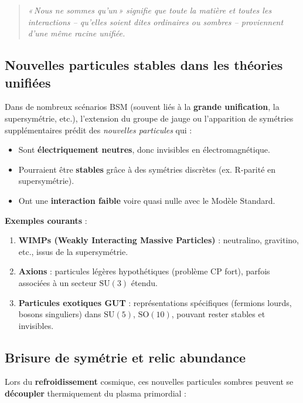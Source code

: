 \documentclass[12pt]{article}
\begin{document}
\begin{quote}
\emph{«\,Nous ne sommes qu’un\,» signifie que toute la matière et toutes les interactions -- qu’elles soient dites \og ordinaires \fg{} ou \og sombres \fg{} -- proviennent d’une même racine unifiée.}
\end{quote}

\subsection{Nouvelles particules stables dans les théories unifiées}

Dans de nombreux scénarios BSM (souvent liés à la \textbf{grande unification}, la supersymétrie, etc.), l’extension du groupe de jauge ou l’apparition de symétries supplémentaires prédit des \emph{nouvelles particules} qui :

\begin{itemize}
  \item Sont \textbf{électriquement neutres}, donc invisibles en électromagnétique.
  \item Pourraient être \textbf{stables} grâce à des symétries discrètes (ex. R-parité en supersymétrie).
  \item Ont une \textbf{interaction faible} voire quasi nulle avec le Modèle Standard.
\end{itemize}

\textbf{Exemples courants} \cite{jungman1996supersymmetric, feng2010dark} :
\begin{enumerate}
  \item \textbf{WIMPs (Weakly Interacting Massive Particles)} : neutralino, gravitino, etc., issus de la supersymétrie.
  \item \textbf{Axions} : particules légères hypothétiques (problème CP fort), parfois associées à un secteur \(\mathrm{SU}(3)\) étendu.
  \item \textbf{Particules exotiques GUT} : représentations spécifiques (fermions lourds, bosons singuliers) dans \(\mathrm{SU}(5)\), \(\mathrm{SO}(10)\), pouvant rester stables et invisibles.
\end{enumerate}

\subsection{Brisure de symétrie et relic abundance}

Lors du \textbf{refroidissement} cosmique, ces nouvelles particules sombres peuvent se \textbf{découpler} thermiquement du plasma primordial :
\end{document}
